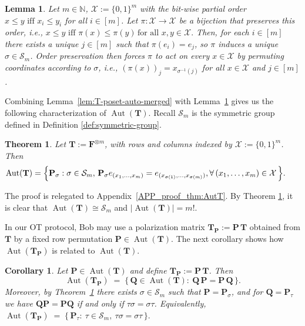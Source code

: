 \documentclass[onecolumn]{IEEEtran} %
\newcommand{\1}{\mathbbm{1}}
\DeclareMathOperator{\Aut}{Aut}
\theoremstyle{boldremark}
\newtheorem{corollary}{Corollary}
\newtheorem{thm}{Theorem}
\newtheorem{lemma}{Lemma}
\newcommand{\bT}{\mathbf{T}}
\begin{document}


\begin{lemma}\label{lem:bool-aut}
Let \(m\in\mathbb N\), \(\mathcal X:=\{0,1\}^m\) with the bit-wise partial order
\(x\le y \mbox{ iff } x_i\le y_i\) for all \(i\in[m]\).
Let \(\pi:\mathcal X\to\mathcal X\) be a bijection that preserves this order, i.e.,
$  x\le y \mbox{ iff } \pi(x)\le \pi(y)\,\text{for all }x,y\in\mathcal X.$ Then, for each \(i\in[m]\) there exists a unique \(j\in[m]\) such that
\(\pi(e_i)=e_j\), so \(\pi\) induces a unique \(\sigma\in\mathcal S_m\). Order preservation then forces \(\pi\) to act on every \(x\in\mathcal X\) by permuting coordinates according to \(\sigma\), i.e., \((\pi(x))_j = x_{\sigma^{-1}(j)}\) for all \(x\in\mathcal X\) and \(j\in[m]\).
\end{lemma}



\medskip
Combining Lemma~\ref{lem:T-poset-auto-merged} with Lemma~\ref{lem:bool-aut}
gives us the following characterization of $\Aut(\mathbf T)$. Recall $\mathcal{S}_m$ is the symmetric group defined in Definition \ref{def:symmetric-group}.
\begin{thm}\label{thm:AutT}
Let $\mathbf T := \mathbf F^{\otimes m}$, with rows and columns indexed by
$\mathcal{X}:=\{0,1\}^m$. Then
\begin{align}
&\hspace{-0.3cm}\Aut(\mathbf T)
    =\Bigl\{\mathbf P_\sigma: \sigma\in\mathcal{S}_m,\,\mathbf P_\sigma e_{(x_1,\dots,x_m)}=e_{(x_{\sigma(1)},\dots,x_{\sigma(m)})}, \forall\,(x_1,\dots,x_m)\in\mathcal{X}
    \,\Bigr\}.    
\end{align}
\end{thm}


The proof is relegated to Appendix~\ref{APP_proof_thm:AutT}. By Theorem \ref{thm:AutT},
it is clear that \(\Aut(\mathbf{T})\cong \mathcal{S}_m\) and $|\Aut(\mathbf T)|=m!$.

\medskip
In our OT protocol, Bob may use a polarization matrix
$\mathbf T_{\mathbf P}:=\mathbf P\,\mathbf T$ obtained from $\mathbf T$
by a fixed row permutation $\mathbf P\in\Aut(\bT)$. The next corollary shows how
$\Aut(\mathbf T_{\mathbf P})$ is related to $\Aut(\mathbf T)$.

\begin{corollary}\label{cor:one-sided-iso-clean}
Let \(\mathbf P\in\Aut(\mathbf T)\) and define \(\mathbf T_{\mathbf P}:=\mathbf P\,\mathbf T\).
Then
\[
  \Aut(\mathbf T_{\mathbf P})
  \;=\;
  \bigl\{\,\mathbf Q\in\Aut(\mathbf T):\ \mathbf Q\,\mathbf P=\mathbf P\,\mathbf Q\,\bigr\}.
\]
Moreover, by Theorem~\ref{thm:AutT} there exists \(\sigma\in\mathcal S_m\) such that
\(\mathbf P=\mathbf P_\sigma\), and for \(\mathbf Q=\mathbf P_\tau\) we have
\(\mathbf Q\mathbf P=\mathbf P\mathbf Q\) if and only if \(\tau\sigma=\sigma\tau\).
Equivalently, $  \Aut(\mathbf T_{\mathbf P})  \;=\;  \bigl\{\,\mathbf P_\tau:\ \tau\in\mathcal S_m,\ \tau\sigma=\sigma\tau\,\bigr\}.$
\end{corollary}
\end{document}
